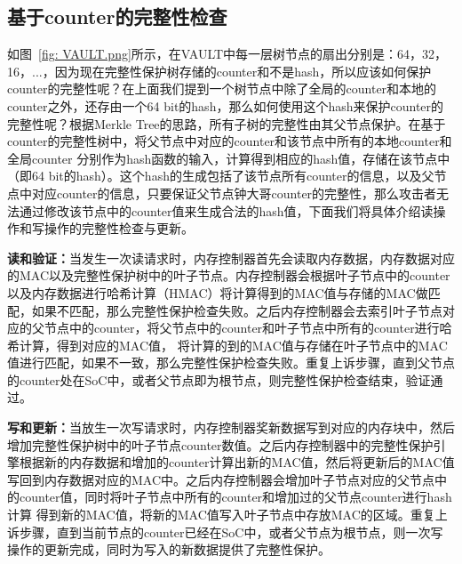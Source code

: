 \subsection{基于counter的完整性检查}
如图~\ref{fig: VAULT.png}所示，在VAULT中每一层树节点的扇出分别是：64，32，16，...，因为现在完整性保护树存储的counter和不是hash，所以应该如何保护counter的完整性呢？在上面我们提到一个树节点中除了全局的counter和本地的counter之外，还存由一个64 bit的hash，那么如何使用这个hash来保护counter的完整性呢？根据Merkle Tree的思路，所有子树的完整性由其父节点保护。在基于counter的完整性树中，将父节点中对应的counter和该节点中所有的本地counter和全局counter
分别作为hash函数的输入，计算得到相应的hash值，存储在该节点中（即64 bit的hash）。这个hash的生成包括了该节点所有counter的信息，以及父节点中对应counter的信息，只要保证父节点钟大哥counter的完整性，那么攻击者无法通过修改该节点中的counter值来生成合法的hash值，下面我们将具体介绍读操作和写操作的完整性检查与更新。

\textbf{读和验证：}当发生一次读请求时，内存控制器首先会读取内存数据，内存数据对应的MAC以及完整性保护树中的叶子节点。内存控制器会根据叶子节点中的counter以及内存数据进行哈希计算（HMAC）将计算得到的MAC值与存储的MAC做匹配，如果不匹配，那么完整性保护检查失败。之后内存控制器会去索引叶子节点对应的父节点中的counter，将父节点中的counter和叶子节点中所有的counter进行哈希计算，得到对应的MAC值，
将计算的到的MAC值与存储在叶子节点中的MAC值进行匹配，如果不一致，那么完整性保护检查失败。重复上诉步骤，直到父节点的counter处在SoC中，或者父节点即为根节点，则完整性保护检查结束，验证通过。

\textbf{写和更新：}当放生一次写请求时，内存控制器奖新数据写到对应的内存块中，然后增加完整性保护树中的叶子节点counter数值。之后内存控制器中的完整性保护引擎根据新的内存数据和增加的counter计算出新的MAC值，然后将更新后的MAC值写回到内存数据对应的MAC中。之后内存控制器会增加叶子节点对应的父节点中的counter值，同时将叶子节点中所有的counter和增加过的父节点counter进行hash计算
得到新的MAC值，将新的MAC值写入叶子节点中存放MAC的区域。重复上诉步骤，直到当前节点的counter已经在SoC中，或者父节点为根节点，则一次写操作的更新完成，同时为写入的新数据提供了完整性保护。
